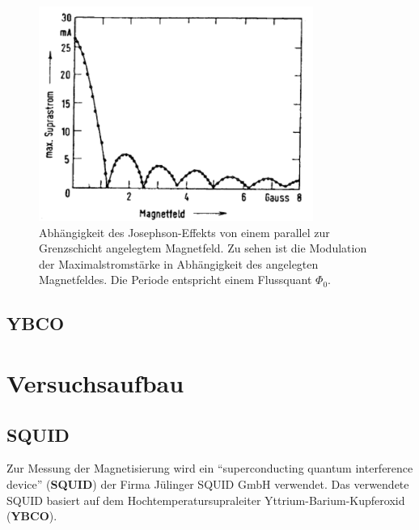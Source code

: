 \documentclass[a4paper,ngerman]{scrartcl}
\begin{document}
\begin{figure}[tbh!]
  \centering
  \includegraphics[width=0.8\textwidth]{abbildungen/josephson_modulation.png}
  \caption{Abhängigkeit des Josephson-Effekts von einem parallel zur Grenzschicht angelegtem Magnetfeld. Zu sehen ist die Modulation der Maximalstromstärke in Abhängigkeit des angelegten Magnetfeldes. Die Periode entspricht einem Flussquant $\Phi_0$.}
  \label{fig:josephson}
\end{figure}

\subsection{YBCO}

 


\section{Versuchsaufbau}

\subsection{SQUID}

Zur Messung der Magnetisierung wird ein "`superconducting quantum interference device"' (\textbf{SQUID}) der Firma Jülinger SQUID GmbH verwendet. 
Das verwendete SQUID basiert auf dem Hochtemperatursupraleiter Yttrium-Barium-Kupferoxid (\textbf{YBCO}).
\end{document}
